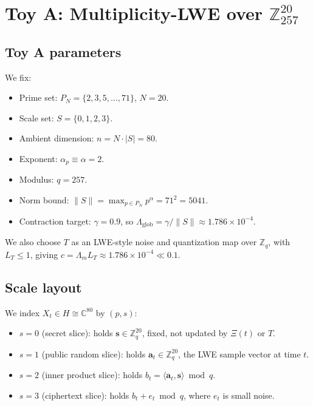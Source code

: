 \documentclass[11pt]{article}
\begin{document}
\section{Toy A: Multiplicity-LWE over $\mathbb{Z}_{257}^{20}$}

\subsection{Toy A parameters}

We fix:

\begin{itemize}
    \item Prime set: $P_N = \{2,3,5,\dots,71\}$, $N=20$.
    \item Scale set: $S = \{0,1,2,3\}$.
    \item Ambient dimension: $n = N \cdot |S| = 80$.
    \item Exponent: $\alpha_p \equiv \alpha = 2$.
    \item Modulus: $q = 257$.
    \item Norm bound: $\|S\| = \max_{p \in P_N} p^{\alpha} = 71^2 = 5041$.
    \item Contraction target: $\gamma = 0.9$, so
    $\Lambda_{\mathrm{glob}} = \gamma / \|S\| \approx 1.786\times 10^{-4}$.
\end{itemize}

We also choose $T$ as an LWE-style noise and quantization map over $\mathbb{Z}_q$,
with $L_T \le 1$, giving $c = \Lambda_m L_T \approx 1.786\times 10^{-4} \ll 0.1$.

\subsection{Scale layout}

We index $X_t \in H \cong \mathbb{C}^{80}$ by $(p,s)$:

\begin{itemize}
    \item $s=0$ (secret slice): holds $\mathbf{s} \in \mathbb{Z}_q^{20}$,
    fixed, not updated by $\Xi(t)$ or $T$.

    \item $s=1$ (public random slice): holds $\mathbf{a}_t \in \mathbb{Z}_q^{20}$,
    the LWE sample vector at time $t$.

    \item $s=2$ (inner product slice): holds $b_t = \langle \mathbf{a}_t,
    \mathbf{s}\rangle \bmod q$.

    \item $s=3$ (ciphertext slice): holds $b_t + e_t \bmod q$, where $e_t$
    is small noise.
\end{itemize}
\end{document}
